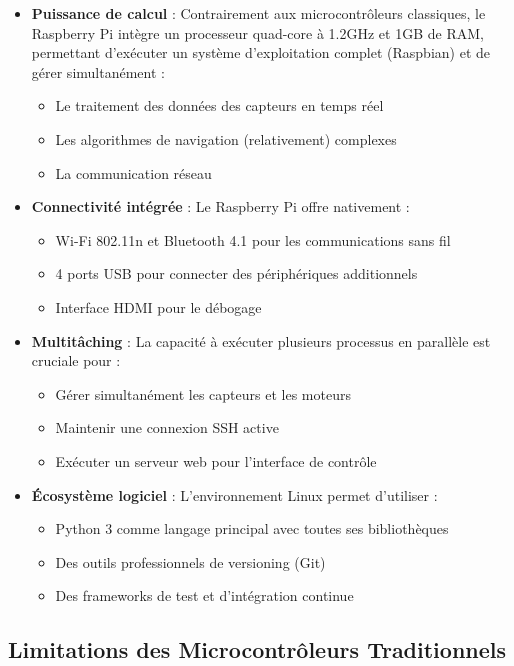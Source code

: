 \documentclass[a4paper, 12pt]{article}
\begin{document}
	\begin{itemize}
		\item \textbf{Puissance de calcul} : Contrairement aux microcontrôleurs classiques, le Raspberry Pi intègre un processeur quad-core à 1.2GHz et 1GB de RAM, permettant d'exécuter un système d'exploitation complet (Raspbian) et de gérer simultanément :
		\begin{itemize}
			\item Le traitement des données des capteurs en temps réel
			\item Les algorithmes de navigation (relativement) complexes
			\item La communication réseau
		\end{itemize}
		
		\item \textbf{Connectivité intégrée} : Le Raspberry Pi offre nativement :
		\begin{itemize}
			\item Wi-Fi 802.11n et Bluetooth 4.1 pour les communications sans fil
			\item 4 ports USB pour connecter des périphériques additionnels
			\item Interface HDMI pour le débogage
		\end{itemize}
		
		\item \textbf{Multitâching} : La capacité à exécuter plusieurs processus en parallèle est cruciale pour :
		\begin{itemize}
			\item Gérer simultanément les capteurs et les moteurs
			\item Maintenir une connexion SSH active
			\item Exécuter un serveur web pour l'interface de contrôle
		\end{itemize}
		
		\item \textbf{Écosystème logiciel} : L'environnement Linux permet d'utiliser :
		\begin{itemize}
			\item Python 3 comme langage principal avec toutes ses bibliothèques
			\item Des outils professionnels de versioning (Git)
			\item Des frameworks de test et d'intégration continue
		\end{itemize}
	\end{itemize}
	
	\subsection{Limitations des Microcontrôleurs Traditionnels}
	
\end{document}
